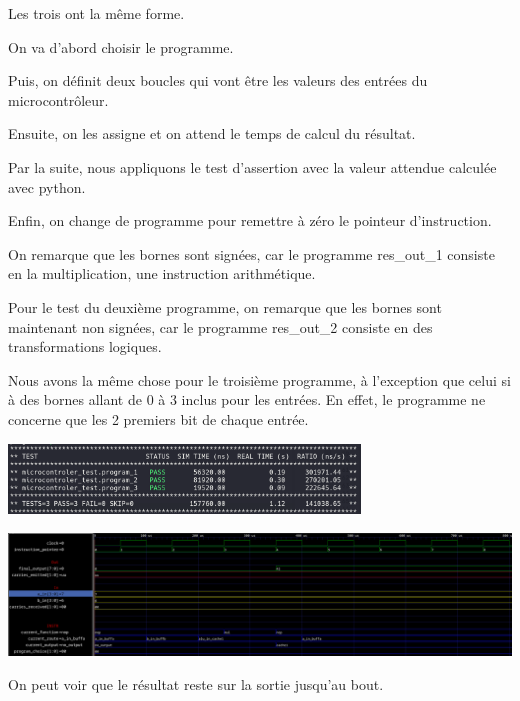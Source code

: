 \documentclass[circuitt, largebox]{efrei_report_card}
\begin{document}
{{      

      Les trois ont la même forme.

      On va d'abord choisir le programme.

      Puis, on définit deux boucles qui vont être les valeurs des entrées du microcontrôleur.

      Ensuite, on les assigne et on attend le temps de calcul du résultat.

      Par la suite, nous appliquons le test d'assertion avec la valeur attendue calculée avec python.

      Enfin, on change de programme pour remettre à zéro le pointeur d'instruction.

      On remarque que les bornes sont signées, car le programme res\_out\_1 consiste en la multiplication, une instruction arithmétique.

      \medskip

      Pour le test du deuxième programme, on remarque que les bornes sont maintenant non signées, car le programme res\_out\_2 consiste en des transformations logiques.

      \medskip

      Nous avons la même chose pour le troisième programme, à l'exception que celui si à des bornes allant de 0 à 3 inclus pour les entrées.
      En effet, le programme ne concerne que les 2 premiers bit de chaque entrée.

      \begin{center}
        \includegraphics[width=0.7\textwidth]{microcontroler/tests_passed.png}
      \end{center}\medskip

      \includegraphics[width=\textwidth]{microcontroler/wave.png}
      \smallskip

      On peut voir que le résultat reste sur la sortie jusqu'au bout.
    }
  }

\end{document}

